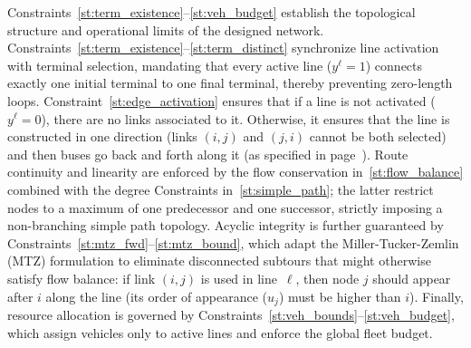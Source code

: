 \documentclass[a4paper,fleqn]{cas-sc}
\begin{document}
%
Constraints~\eqref{st:term_existence}--\eqref{st:veh_budget} establish the topological structure and operational limits of the designed network. 
%
Constraints~\eqref{st:term_existence}--\eqref{st:term_distinct} synchronize line activation with terminal selection, mandating that every active line ($y^\ell=1$) connects exactly one initial terminal to one final terminal, thereby preventing zero-length loops. 
%
Constraint~\eqref{st:edge_activation} ensures that if a line is not activated ($y^\ell=0$), there are no links associated to it. Otherwise, it ensures that the line is constructed in one direction (links $(i,j)$ and $(j,i)$ cannot be both selected) and then buses go back and forth along it (as specified in page~\pageref{sentence:line-in-one-direction}).
%
%
%
Route continuity and linearity are enforced by the flow conservation in~\eqref{st:flow_balance} combined with the degree Constraints in~\eqref{st:simple_path}; the latter restrict nodes to a maximum of one predecessor and one successor, strictly imposing a non-branching simple path topology. 
%
Acyclic integrity is further guaranteed by Constraints~\eqref{st:mtz_fwd}--\eqref{st:mtz_bound}, which adapt the Miller-Tucker-Zemlin (MTZ) formulation to eliminate disconnected subtours that might otherwise satisfy flow balance: if link $(i,j)$ is used in line~$\ell$, then node $j$ should appear after $i$ along the line (its order of appearance ($u_j$) must be higher than $i$).
%
Finally, resource allocation is governed by Constraints~\eqref{st:veh_bounds}--\eqref{st:veh_budget}, which assign vehicles only to active lines and enforce the global fleet budget.
%
\end{document}
